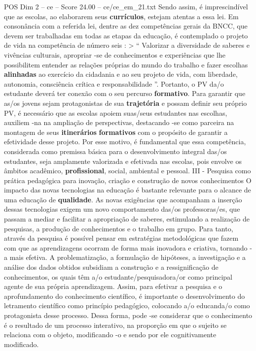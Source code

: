 \begin{textsample}{POS Dim 2 – ce – Score 24.00 – ce/ce\_em\_21.txt}
Sendo assim, é imprescindível que as escolas, ao elaborarem seus \textbf{currículos}, estejam atentas a essa lei.
Em consonância com a referida lei, dentre as dez competências gerais da BNCC, que devem ser trabalhadas em todas as etapas da educação, é contemplado o projeto de vida na competência de número seis : > “ Valorizar a diversidade de saberes e vivências culturais, apropriar -se de conhecimentos e experiências que lhe possibilitem entender as relações próprias do mundo do trabalho e fazer escolhas \textbf{alinhadas} ao exercício da cidadania e ao seu projeto de vida, com liberdade, autonomia, consciência crítica e responsabilidade ”.
Portanto, o PV da/o estudante deverá ter conexão com o seu percurso \textbf{formativo}.
Para garantir que as/os jovens sejam protagonistas de sua \textbf{trajetória} e possam definir seu próprio PV, é necessário que as escolas apoiem suas/seus estudantes nas escolhas, auxiliem -na na ampliação de perspectivas, destacando -se como parceira na montagem de seus \textbf{itinerários} \textbf{formativos} com o propósito de garantir a efetividade desse projeto.
Por esse motivo, é fundamental que essa competência, considerada como premissa básica para o desenvolvimento integral das/os estudantes, seja amplamente valorizada e efetivada nas escolas, pois envolve os âmbitos acadêmico, \textbf{profissional}, social, ambiental e pessoal.
III - Pesquisa como prática pedagógica para inovação, criação e construção de novos conhecimentos O impacto das novas tecnologias na educação é bastante relevante para o alcance de uma educação de \textbf{qualidade}.
As novas exigências que acompanham a inserção dessas tecnologias exigem um novo comportamento das/os professoras/es, que passam a mediar e facilitar a apropriação de saberes, estimulando a realização de pesquisas, a produção de conhecimentos e o trabalho em grupo.
Para tanto, através da pesquisa é possível pensar em estratégias metodológicas que fazem com que as aprendizagens ocorram de forma mais inovadora e criativa, tornando -a mais efetiva.
A problematização, a formulação de hipóteses, a investigação e a análise dos dados obtidos subsidiam a construção e a ressignificação de conhecimentos, os quais têm a/o estudante/pesquisadora/or como principal agente de sua própria aprendizagem.
Assim, para efetivar a pesquisa e o aprofundamento do conhecimento científico, é importante o desenvolvimento do letramento científico como princípio pedagógico, colocando a/o educanda/o como protagonista desse processo.
Dessa forma, pode -se considerar que o conhecimento é o resultado de um processo interativo, na proporção em que o sujeito se relaciona com o objeto, modificando -o e sendo por ele cognitivamente modificado.

\end{textsample}
